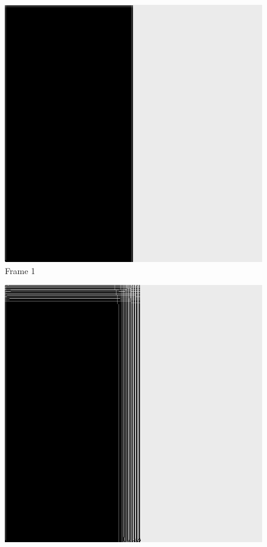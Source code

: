 \documentclass[a4paper, 12pt, oneside]{book}
\begin{document}
\begin{figure}[!ht]
        \begin{center}
            \includegraphics[width=\linewidth]{images/test_case_2/1.png}
            Frame 1
        \end{center}
    \endminipage
    \hfill
        \begin{center}
            \includegraphics[width=\linewidth]{images/test_case_2/21.png}

\end{center}
\end{figure}
\end{document}
